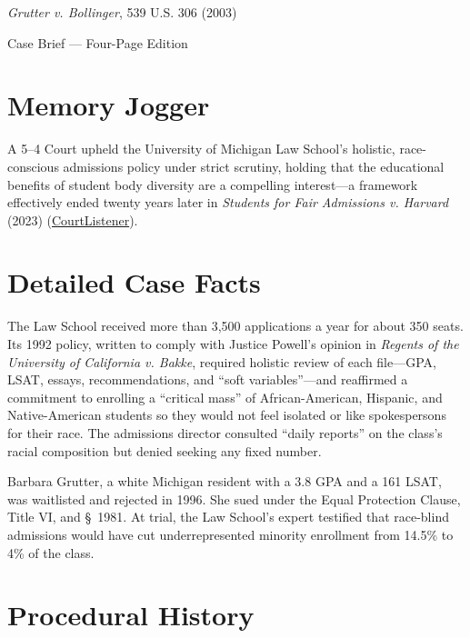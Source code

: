 \documentclass[12pt]{article}
\begin{document}
\begin{center}
{\LARGE \textit{Grutter v. Bollinger}, 539 U.S. 306 (2003)\par}
\vspace{0.8em}
{\large Case Brief --- Four-Page Edition\par}
\end{center}
\vspace{1em}

\section{Memory Jogger}

A 5--4 Court upheld the University of Michigan Law School's holistic, race-conscious admissions policy under strict scrutiny, holding that the educational benefits of student body diversity are a compelling interest---a framework effectively ended twenty years later in \textit{Students for Fair Admissions v. Harvard} (2023) (\href{https://www.courtlistener.com/opinion/130155/grutter-v-bollinger/}{CourtListener}).

\section{Detailed Case Facts}

The Law School received more than 3,500 applications a year for about 350 seats. Its 1992 policy, written to comply with Justice Powell's opinion in \textit{Regents of the University of California v. Bakke}, required holistic review of each file---GPA, LSAT, essays, recommendations, and ``soft variables''---and reaffirmed a commitment to enrolling a ``critical mass'' of African-American, Hispanic, and Native-American students so they would not feel isolated or like spokespersons for their race. The admissions director consulted ``daily reports'' on the class's racial composition but denied seeking any fixed number.

Barbara Grutter, a white Michigan resident with a 3.8 GPA and a 161 LSAT, was waitlisted and rejected in 1996. She sued under the Equal Protection Clause, Title VI, and \S~1981. At trial, the Law School's expert testified that race-blind admissions would have cut underrepresented minority enrollment from 14.5\% to 4\% of the class.

\section{Procedural History}
\end{document}
